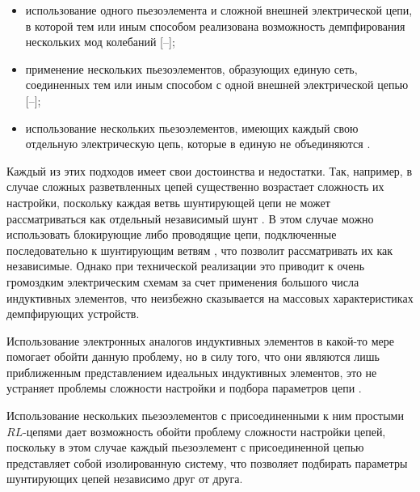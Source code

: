 \begin{itemize}

\item[–]	использование одного пьезоэлемента и сложной внешней электрической цепи, в которой тем или иным способом реализована  возможность демпфирования нескольких мод колебаний [--];



\item[–]	применение нескольких пьезоэлементов, образующих единую сеть, соединенных тем или иным способом с одной внешней электрической цепью [--];



\item[–]	использование нескольких пьезоэлементов, имеющих каждый свою отдельную электрическую цепь, которые в единую не объединяются \cite{mult:Ref18,mult:Ref19}.



\end{itemize}



Каждый из этих подходов имеет свои достоинства и недостатки. Так, например, в случае сложных разветвленных цепей существенно возрастает сложность их настройки, поскольку каждая ветвь шунтирующей цепи не может рассматриваться как отдельный независимый шунт \cite{mult:Ref4}. В этом случае можно использовать блокирующие  либо проводящие цепи, подключенные последовательно к шунтирующим ветвям \cite{mult:Ref5,mult:Ref8}, что позволит рассматривать их как независимые. Однако при технической реализации это приводит к очень громоздким электрическим схемам за счет применения большого числа индуктивных элементов, что неизбежно сказывается на массовых характеристиках демпфирующих устройств. 

Использование электронных аналогов индуктивных элементов в какой-то мере помогает обойти данную проблему, но в силу того, что они являются лишь приближенным представлением идеальных индуктивных элементов, это не устраняет проблемы сложности настройки и подбора параметров цепи \cite{mult:Ref10}.



Использование нескольких пьезоэлементов с присоединенными к ним простыми $RL$-цепями дает возможность обойти проблему сложности настройки цепей, поскольку в этом случае каждый пьезоэлемент с присоединенной цепью представляет собой изолированную систему, что позволяет подбирать параметры шунтирующих цепей независимо друг от друга. 

